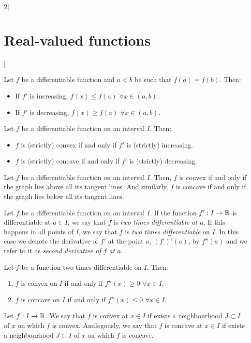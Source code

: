 \documentclass[../../../main.tex]{subfiles}
\begin{document}
\begin{multicols}{2}[\section{Real-valued functions}]
\begin{lemma}
    Let $f$ be a differentiable function and $a<b$ be such that $f(a)=f(b)$. Then:
    \begin{itemize}
      \item If $f'$ is increasing, $f(x)\leq f(a)$ $\forall x\in(a,b)$.
      \item If $f'$ is decreasing, $f(x)\geq f(a)$ $\forall x\in(a,b)$.
    \end{itemize}
  \end{lemma}
  \begin{theorem}
    Let $f$ be a differentiable function on an interval $I$. Then:
    \begin{itemize}
      \item $f$ is (strictly) convex if and only if $f'$ is (strictly) increasing.
      \item $f$ is (strictly) concave if and only if $f'$ is (strictly) decreasing.
    \end{itemize}
  \end{theorem}
  \begin{theorem}
    Let $f$ be a differentiable function on an interval $I$. Then, $f$ is convex if and only if the graph lies above all its tangent lines. And similarly, $f$ is concave if and only if the graph lies below all its tangent lines.
  \end{theorem}
  \begin{definition}\label{RVF_second-derivative}
    Let $f$ be a differentiable function on an interval $I$. If the function $f':I\rightarrow\mathbb{R}$ is differentiable at $a\in I$, we say that $f$ is \emph{two times differentiable at $a$}. If this happens in all points of $I$, we say that $f$ is \emph{two times differentiable} on $I$. In this case we denote the derivative of $f'$ at the point $a$, $(f')'(a)$, by $f''(a)$ and we refer to it as \emph{second derivative of $f$ at $a$}.
  \end{definition}
  \begin{theorem}
    Let $f$ be a function two times differentiable on $I$. Then:
    \begin{enumerate}
      \item $f$ is convex on $I$ if and only if $f''(x)\geq 0$ $\forall x\in I$.
      \item $f$ is concave on $I$ if and only if $f''(x)\leq 0$ $\forall x\in I$.
    \end{enumerate}
  \end{theorem}
  \begin{definition}
    Let $f:I\rightarrow\mathbb{R}$. We say that $f$ is convex at $x\in I$ if exists a neighbourhood $J\subset I$ of $x$ on which $f$ is convex. Analogously, we say that $f$ is concave at $x\in I$ if exists a neighbourhood $J\subset I$ of $x$ on which $f$ is concave.

\end{definition}
\end{multicols}
\end{document}
